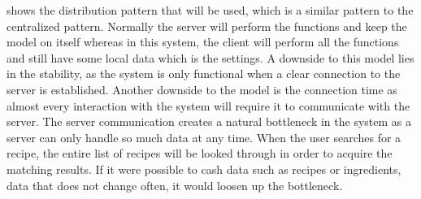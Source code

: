  shows the distribution pattern that will be used, which is a similar pattern to the centralized pattern. Normally the server will perform the functions and keep the model on itself whereas in this system, the client will perform all the functions and still have some local data which is the settings. A downside to this model lies in the stability, as the system is only functional when a clear connection to the server is established. Another downside to the model is the connection time as almost every interaction with the system will require it to communicate with the server. The server communication creates a natural bottleneck in the system as a server can only handle so much data at any time. When the user searches for a recipe, the entire list of recipes will be looked through in order to acquire the matching results. If it were possible to cash data such as recipes or ingredients, data that does not change often, it would loosen up the bottleneck.